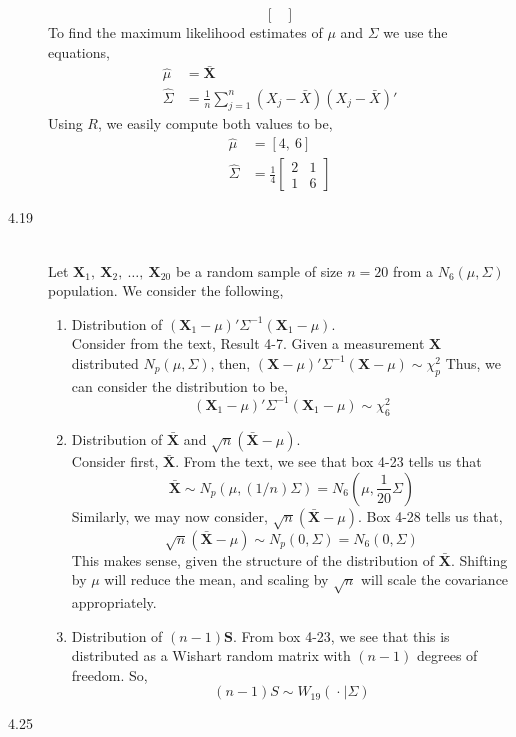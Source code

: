 \documentclass[letterpaper,10pt]{article}
\begin{document}
\begin{description}
\[\begin{bmatrix}
\end{bmatrix} \]
To find the maximum likelihood estimates of $\mu$ and $\Sigma$ we use the equations,
\begin{align*}
\hat{\mu} &= \bar{\textbf{X}}\\
\hat{\Sigma} &= \frac{1}{n}\sum_{j=1}^n(X_j-\bar{X})(X_j-\bar{X})'
\end{align*}
Using $R$, we easily compute both values to be,
\begin{align*}
\hat{\mu} &=[4,\ 6]\\
\hat{\Sigma} &= \frac{1}{4}\begin{bmatrix}
2 & 1\\1 & 6
\end{bmatrix}
\end{align*}
\item[4.19]\hfill\\
Let $\textbf{X}_1,\ \textbf{X}_2,\ \ldots,\ \textbf{X}_{20}$ be a random sample of size $n=20$ from a $N_6(\mu,\Sigma)$ population. We consider the following,
\begin{enumerate}[label=\alph*.]
\item Distribution of $(\textbf{X}_1-\mu)'\Sigma^{-1}(\textbf{X}_1-\mu)$.\\
Consider from the text, Result 4-7. Given a measurement $\textbf{X}$ distributed $N_p(\mu,\Sigma)$, then, $(\textbf{X}-\mu)'\Sigma^{-1}(\textbf{X}-\mu)\sim \chi_p^2$ Thus, we can consider the distribution to be,
\[(\textbf{X}_1-\mu)'\Sigma^{-1}(\textbf{X}_1-\mu)\sim\chi_6^2 \]
\item Distribution of $\bar{\textbf{X}}$ and $\sqrt{n}(\bar{\textbf{X}}-\mu)$.\\
Consider first, $\bar{\textbf{X}}$. From the text, we see that box 4-23 tells us that
\[\bar{\textbf{X}}\sim N_p(\mu,(1/n)\Sigma)=N_6(\mu,\frac{1}{20}\Sigma)\]
Similarly, we may now consider, $\sqrt{n}(\bar{\textbf{X}}-\mu)$. Box 4-28 tells us that,
\[\sqrt{n}(\bar{\textbf{X}}-\mu)\sim N_p(0,\Sigma)=N_6(0,\Sigma)\]
This makes sense, given the structure of the distribution of $\bar{\textbf{X}}$. Shifting by $\mu$ will reduce the mean, and scaling by $\sqrt{n}$ will scale the covariance appropriately.
\item Distribution of $(n-1)\textbf{S}$. From box 4-23, we see that this is distributed as a Wishart random matrix with $(n-1)$ degrees of freedom. So,
\[(n-1)S\sim W_{19}(\ \boldsymbol{\cdot}\ |\Sigma)\]
\end{enumerate}
\item[4.25]\hfill \\

\end{description}
\end{document}
